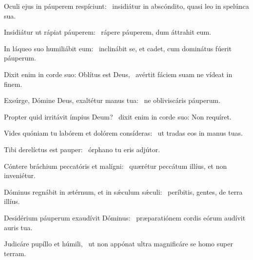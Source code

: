 \item Oculi ejus in páuperem respíciunt:~\psstar{} insidiátur in abscóndito, quasi leo in spelúnca sua.

\item Insidiátur ut rápiat páuperem:~\psstar{} rápere páuperem, dum áttrahit eum.

\item In láqueo suo humiliábit eum:~\psstar{} inclinábit se, et cadet, cum dominátus fúerit páuperum.

\item Dixit enim in corde suo: Oblítus est Deus,~\psstar{} avértit fáciem suam ne vídeat in finem.

\item Exsúrge, Dómine Deus, exaltétur manus tua:~\psstar{} ne obliviscáris páuperum.

\item Propter quid irritávit ímpius Deum?~\psstar{} dixit enim in corde suo: Non requíret.

\item Vides quóniam tu labórem et dolórem consíderas:~\psstar{} ut tradas eos in manus tuas.

\item Tibi derelíctus est pauper:~\psstar{} órphano tu eris adjútor.

\item Cóntere bráchium peccatóris et malígni:~\psstar{} quærétur peccátum illíus, et non inveniétur.

\item Dóminus regnábit in ætérnum, et in sǽculum sǽculi:~\psstar{} períbitis, gentes, de terra illíus.

\item Desidérium páuperum exaudívit Dóminus:~\psstar{} præparatiónem cordis eórum audívit auris tua.

\item Judicáre pupíllo et húmili,~\psstar{} ut non appónat ultra magnificáre se homo super terram.